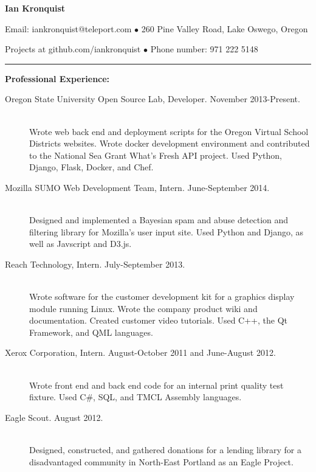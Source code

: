 \documentclass[11pt]{article}
\begin{document}
\centerline{{\LARGE \bf Ian Kronquist}}

\bigskip

\centerline{
	Email: iankronquist@teleport.com
	$\bullet$
	260 Pine Valley Road, Lake Oswego, Oregon
}
\centerline{
	Projects at github.com/iankronquist
	$\bullet$
	Phone number: 971 222 5148
}


\bigskip

\bigskip

\hrule

\bigskip

\bigskip

{\Large \bf Professional Experience:}
\normalsize
\begin{description}

	\item[Oregon State University Open Source Lab, Developer.
		\hfill November 2013-Present.]
		\hfill \\
		Wrote web back end and deployment scripts for the
		Oregon Virtual School Districts websites. 
		Wrote docker development environment and contributed to the
		National Sea Grant What's Fresh API project.
		Used Python, Django, Flask, Docker, and Chef.

	\item[Mozilla SUMO Web Development Team, Intern.
		\hfill June-September 2014.]
		\hfill \\
		Designed and implemented a Bayesian spam and abuse detection and
		filtering library for Mozilla's user input site.
		Used Python and Django, as well as Javscript and D3.js.

	\item[Reach Technology, Intern.
		\hfill July-September 2013.]
		\hfill \\
		Wrote software for the customer development kit for a graphics
		display module running Linux. Wrote the company product wiki 
		and documentation. Created customer video tutorials. Used C++,
		the Qt Framework, and QML languages.

	\item[Xerox Corporation, Intern.
		\hfill  August-October 2011 and June-August 2012.]
		\hfill \\
		Wrote front end and back end code for an internal print quality
		test fixture.
		Used C\#, SQL, and TMCL Assembly languages.

	\item[Eagle Scout.
		\hfill August 2012.]
		\hfill \\
		Designed, constructed, and gathered donations for a lending library
		for a disadvantaged community in North-East Portland as an Eagle
		Project.

\end{description}
\end{document}
